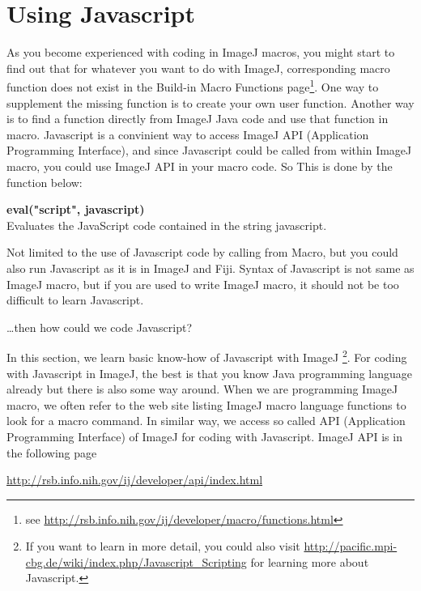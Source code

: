 \documentclass[11pt,a4paper,oneside]{report}
\newenvironment{indentCom}%
{\begin{list}{}%
         {\setlength{\leftmargin}{1em}}%
         \item[]%
}
{\end{list}}
\begin{document}
\newpage

\section{Using Javascript}

As you become experienced with coding in ImageJ macros, you might start to find
out that for whatever you want to do with ImageJ, corresponding macro function does not exist in the Build-in Macro Functions page\footnote{ see \url{http://rsb.info.nih.gov/ij/developer/macro/functions.html}}. One way to supplement the missing function is to create your own user function. Another way is to find a function directly from ImageJ Java code and use that function in macro. Javascript is a convinient way to access ImageJ API (Application Programming Interface), and since Javascript could be called from within ImageJ macro, you could use ImageJ API in your macro code. So This is done by the function below:
\begin{shaded}
\begin{indentCom}
\item \textbf{eval("script", javascript)}\\
Evaluates the JavaScript code contained in the string javascript.\\
\end{indentCom}
\end{shaded}

Not limited to the use of Javascript code by calling from Macro, 
but you could also run Javascript as 
it is in ImageJ and Fiji. Syntax of Javascript is not same as ImageJ macro, 
but if you are used to write ImageJ macro, it should  not be too difficult to learn Javascript.  
 
\dots then how could we code Javascript? 

In this section, we learn basic know-how of 
Javascript with ImageJ 
\footnote{ If you want to learn in more detail, 
you could also visit \url{http://pacific.mpi-cbg.de/wiki/index.php/Javascript_Scripting} 
for learning more about Javascript.}. For coding with Javascript in ImageJ, the best is that 
you know Java programming language already but there is also some way around. 
When we are programming ImageJ macro, we often refer to the web site listing 
ImageJ macro language functions to look for a macro command. 
In similar way, we access so called API (Application Programming Interface) 
of ImageJ for coding with Javascript. ImageJ API is in the following page

\url{http://rsb.info.nih.gov/ij/developer/api/index.html}
\end{document}
